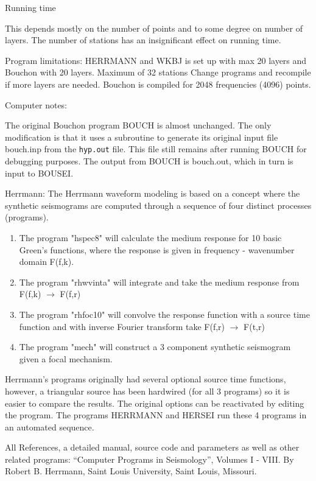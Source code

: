 Running time 

This depends mostly on the number of points and to some degree on number of layers. The number of stations has an insignificant effect on running time.

Program limitations: HERRMANN and WKBJ is set up with max 20 layers and Bouchon with 20 layers. Maximum of 32 stations Change programs and recompile if more layers are needed. Bouchon is compiled for 2048 frequencies (4096) points. 

Computer notes: 

The original Bouchon program BOUCH is almost unchanged. The only modification is that it uses a subroutine to generate its original input file bouch.inp from the \texttt{hyp.out} file. This file still remains after running BOUCH for debugging purposes. The output from BOUCH is bouch.out, which in turn is input to BOUSEI. 

Herrmann: \newline
The Herrmann waveform modeling is based on a concept where the synthetic seismograms are computed through a sequence of four distinct processes (programs). 

\begin{enumerate}
\item
 The program "hspec8" will calculate the medium response for 10 basic Green's functions, where the response is given in frequency - wavenumber domain F(f,k). 
\item
The program "rhwvinta" will integrate and take the medium response from F(f,k) $\to$ F(f,r) 
\item
The program "rhfoc10" will convolve the response function with a source time function 
and with inverse Fourier transform take F(f,r) $\to$ F(t,r) 
\item
The program "mech" will construct a 3 component synthetic seismogram given a focal mechanism. 
\end{enumerate}


Herrmann's programs originally had several optional source time functions, 
however, a triangular source has been hardwired (for all 3 programs) 
so it is easier to compare the results. The original options can be 
reactivated by editing the program. \newline
The programs HERRMANN and HERSEI run these 4 programs in an automated sequence. 

All References, a detailed manual, source code and parameters as well 
as other related programs: ``Computer Programs in Seismology'', 
Volumes I - VIII. By Robert B. Herrmann, Saint Louis University, Saint Louis, Missouri. 

